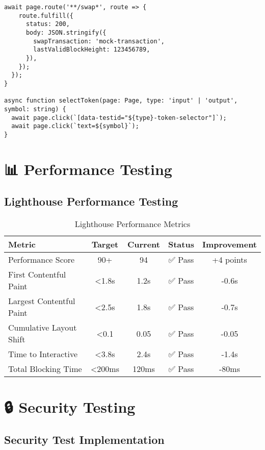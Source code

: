 \documentclass[11pt,a4paper]{article}
\begin{document}
\begin{lstlisting}[style=typescript, caption=E2E Test Implementation]
  await page.route('**/swap*', route => {
    route.fulfill({
      status: 200,
      body: JSON.stringify({
        swapTransaction: 'mock-transaction',
        lastValidBlockHeight: 123456789,
      }),
    });
  });
}

async function selectToken(page: Page, type: 'input' | 'output', symbol: string) {
  await page.click(`[data-testid="${type}-token-selector"]`);
  await page.click(`text=${symbol}`);
}
\end{lstlisting}

\section{📊 Performance Testing}

\subsection{Lighthouse Performance Testing}

\begin{table}[h]
\centering
\begin{tabular}{|l|c|c|c|c|}
\hline
\textbf{Metric} & \textbf{Target} & \textbf{Current} & \textbf{Status} & \textbf{Improvement} \\
\hline
Performance Score & 90+ & 94 & ✅ Pass & +4 points \\
First Contentful Paint & <1.8s & 1.2s & ✅ Pass & -0.6s \\
Largest Contentful Paint & <2.5s & 1.8s & ✅ Pass & -0.7s \\
Cumulative Layout Shift & <0.1 & 0.05 & ✅ Pass & -0.05 \\
Time to Interactive & <3.8s & 2.4s & ✅ Pass & -1.4s \\
Total Blocking Time & <200ms & 120ms & ✅ Pass & -80ms \\
\hline
\end{tabular}
\caption{Lighthouse Performance Metrics}
\end{table}

\section{🔒 Security Testing}

\subsection{Security Test Implementation}
\end{document}
